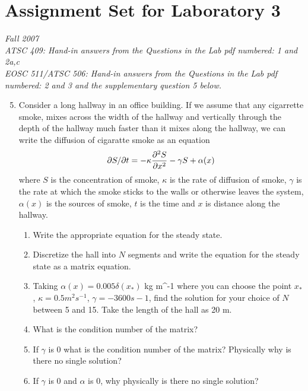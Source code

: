 \documentclass[12pt]{article}
\begin{document}
\section*{Assignment Set for Laboratory 3}
{\it Fall 2007\\
ATSC 409: Hand-in answers from the Questions in the Lab pdf numbered: 1 and 2a,c\\
EOSC 511/ATSC 506: Hand-in answers from the Questions in the Lab pdf numbered: 2 and 3 and the supplementary question 5 below.}


\begin{enumerate}
\setcounter{enumi}{4}
\item Consider a long hallway in an office building.  If we assume that any cigarrette smoke, mixes across the width of the hallway and vertically through the depth of the hallway much faster than it mixes along the hallway, we can write the diffusion of cigaratte smoke as an equation
\[
\partial S/\partial t = - \kappa \frac {\partial^2 S}{\partial x^2} - \gamma S + \alpha(x)
\]
where $S$ is the concentration of smoke, $\kappa$ is the rate of diffusion of smoke, $\gamma$ is the rate at which the smoke sticks to the walls or otherwise leaves the system, $\alpha(x)$ is the sources of smoke, $t$ is the time and $x$ is distance along the hallway.
\begin{enumerate}
\item Write the appropriate equation for the steady state.
\item Discretize the hall into $N$ segments and write the equation for the steady state as a matrix equation.
\item Taking $\alpha(x) = 0.005 \delta(x_*)$ kg m^{-1} where you can choose the point $x_*$, $\kappa = 0.5 m^2 s^{-1}$, $\gamma = -3600 s-1$, find the solution for your choice of $N$ between 5 and 15.  Take the length of the hall as 20 m.
\item What is the condition number of the matrix?
\item If $\gamma$ is 0 what is the condition number of the matrix?  Physically why is there no single solution?
\item If $\gamma$ is 0 and $\alpha$ is 0, why physically is there no single solution?
\end{enumerate}
\end{enumerate}
\end{document}
